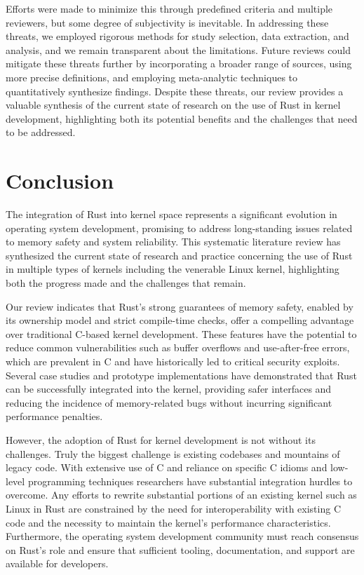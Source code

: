 \documentclass[sigconf]{acmart}
\begin{document}
Efforts were made to minimize this through predefined criteria and multiple reviewers, but some
degree of subjectivity is inevitable.  In addressing these threats, we employed rigorous methods for
study selection, data extraction, and analysis, and we remain transparent about the
limitations. Future reviews could mitigate these threats further by incorporating a broader range of
sources, using more precise definitions, and employing meta-analytic techniques to quantitatively
synthesize findings. Despite these threats, our review provides a valuable synthesis of the current
state of research on the use of Rust in kernel development, highlighting both its potential benefits
and the challenges that need to be addressed.

\section{Conclusion}

The integration of Rust into  kernel space represents a significant evolution in operating system
development, promising to address long-standing issues related to memory safety and system
reliability. This systematic literature review has synthesized the current state of research and
practice concerning the use of Rust in multiple types of kernels including the venerable Linux
kernel, highlighting both the progress made and the challenges that remain.

Our review indicates that Rust's strong guarantees of memory safety, enabled by its ownership model
and strict compile-time checks, offer a compelling advantage over traditional C-based kernel
development. These features have the potential to reduce common vulnerabilities such as buffer
overflows and use-after-free errors, which are prevalent in C and have historically led to critical
security exploits. Several case studies and prototype implementations have demonstrated that Rust
can be successfully integrated into the kernel, providing safer interfaces and reducing the
incidence of memory-related bugs without incurring significant performance penalties.

However, the adoption of Rust for kernel development is not without its challenges. Truly the
biggest challenge is existing codebases and mountains of legacy code. With extensive use of C and
reliance on specific C idioms and low-level programming techniques researchers have substantial
integration hurdles to overcome. Any efforts to rewrite substantial portions of an existing kernel
such as Linux in Rust are constrained by the need for interoperability with existing C code and the
necessity to maintain the kernel's performance characteristics. Furthermore, the operating system
development community must reach consensus on Rust's role and ensure that sufficient tooling,
documentation, and support are available for developers.
\end{document}
